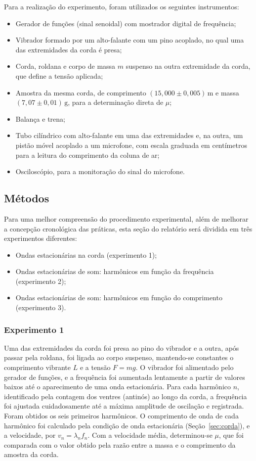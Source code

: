 \documentclass[12pt, a4paper]{article}
\newcommand{\un}[1]{\,\mathrm{#1}}
\begin{document}
Para a realização do experimento, foram utilizados os seguintes instrumentos:
\begin{itemize}
    \item Gerador de funções (sinal senoidal) com mostrador digital de frequência;
    \item Vibrador formado por um alto-falante com um pino acoplado, no qual uma das extremidades da corda é presa;
    \item Corda, roldana e corpo de massa $m$ suspenso na outra extremidade da corda, que define a tensão aplicada;
    \item Amostra da mesma corda, de comprimento $(15{,}000\pm0{,}005)\un{m}$ e massa $(7{,}07\pm0{,}01)\un{g}$, para a determinação direta de $\mu$;
    \item Balança e trena;
    \item Tubo cilíndrico com alto-falante em uma das extremidades e, na outra, um pistão móvel acoplado a um microfone, com escala graduada em centímetros para a leitura do comprimento da coluna de ar;
    \item Osciloscópio, para a monitoração do sinal do microfone.
\end{itemize}

\subsection{Métodos}

Para uma melhor compreensão do procedimento experimental, além de melhorar a concepção cronológica das práticas, esta seção do relatório será dividida em três experimentos diferentes:
\begin{itemize}
    \item Ondas estacionárias na corda (experimento 1);
    \item Ondas estacionárias de som: harmônicos em função da frequência (experimento 2);
    \item Ondas estacionárias de som: harmônicos em função do comprimento (experimento 3).
\end{itemize}

\subsubsection{Experimento 1}

Uma das extremidades da corda foi presa ao pino do vibrador e a outra, após passar pela roldana, foi ligada ao corpo suspenso, mantendo-se constantes o comprimento vibrante $L$ e a tensão $F=mg$. O vibrador foi alimentado pelo gerador de funções, e a frequência foi aumentada lentamente a partir de valores baixos até o aparecimento de uma onda estacionária. Para cada harmônico $n$, identificado pela contagem dos ventres (antinós) ao longo da corda, a frequência foi ajustada cuidadosamente até a máxima amplitude de oscilação e registrada. Foram obtidos os seis primeiros harmônicos. O comprimento de onda de cada harmônico foi calculado pela condição de onda estacionária (Seção~\ref{sec:corda}), e a velocidade, por $v_n=\lambda_nf_n$. Com a velocidade média, determinou-se $\mu$, que foi comparada com o valor obtido pela razão entre a massa e o comprimento da amostra da corda.
\end{document}
